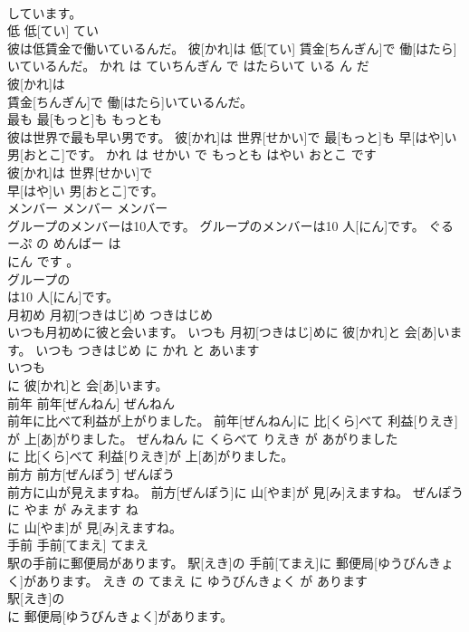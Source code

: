 \documentclass[8pt]{extreport}
\begin{document}
\begin{CJK}{UTF8}{min}
\\	しています。			
\\	低	低[てい]	てい	
\\	彼は低賃金で働いているんだ。	彼[かれ]は 低[てい] 賃金[ちんぎん]で 働[はたら]いているんだ。	かれ は ていちんぎん で はたらいて いる ん だ	
\\	彼[かれ]は
\\	賃金[ちんぎん]で 働[はたら]いているんだ。			
\\	最も	最[もっと]も	もっとも	
\\	彼は世界で最も早い男です。	彼[かれ]は 世界[せかい]で 最[もっと]も 早[はや]い 男[おとこ]です。	かれ は せかい で もっとも はやい おとこ です	
\\	彼[かれ]は 世界[せかい]で
\\	早[はや]い 男[おとこ]です。			
\\	メンバー	メンバー	メンバー	
\\	グループのメンバーは10人です。	グループのメンバーは10 人[にん]です。	ぐるーぷ の めんばー は 
\\	にん です 。	
\\	グループの
\\	は10 人[にん]です。			
\\	月初め	月初[つきはじ]め	つきはじめ	
\\	いつも月初めに彼と会います。	いつも 月初[つきはじ]めに 彼[かれ]と 会[あ]います。	いつも つきはじめ に かれ と あいます	
\\	いつも
\\	に 彼[かれ]と 会[あ]います。			
\\	前年	前年[ぜんねん]	ぜんねん	
\\	前年に比べて利益が上がりました。	前年[ぜんねん]に 比[くら]べて 利益[りえき]が 上[あ]がりました。	ぜんねん に くらべて りえき が あがりました	
\\	に 比[くら]べて 利益[りえき]が 上[あ]がりました。			
\\	前方	前方[ぜんぽう]	ぜんぽう	
\\	前方に山が見えますね。	前方[ぜんぽう]に 山[やま]が 見[み]えますね。	ぜんぽう に やま が みえます ね	
\\	に 山[やま]が 見[み]えますね。			
\\	手前	手前[てまえ]	てまえ	
\\	駅の手前に郵便局があります。	駅[えき]の 手前[てまえ]に 郵便局[ゆうびんきょく]があります。	えき の てまえ に ゆうびんきょく が あります	
\\	駅[えき]の
\\	に 郵便局[ゆうびんきょく]があります。			

\end{CJK}
\end{document}
